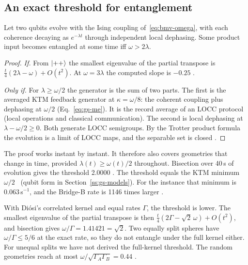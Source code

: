 \subsection{An exact threshold for entanglement}\label{ss:bmv-threshold}

\begin{proposition}[threshold]\label{pr:bmv-threshold}
Let two qubits evolve with the Ising coupling of~\eqref{eq:bmv-omega}, with each coherence decaying as $e^{-\lambda t}$ through independent
local dephasing. Some product input becomes entangled at some time iff $\omega>2\lambda$.
\end{proposition}

\begin{proof}
\emph{If.} From $\lvert ++\rangle$ the smallest eigenvalue of the partial transpose is $\tfrac t4(2\lambda-\omega)+O(t^2)$. At $\omega=3\lambda$ the
computed slope is $-0.25$ .

\emph{Only if.} For $\lambda\ge\omega/2$ the generator is the sum of two parts. The first is the averaged KTM feedback generator at
$\kappa=\omega/8$: the coherent coupling plus dephasing at $\omega/2$ (Eq.~\eqref{eq:gs-me}). It is the record average of an LOCC protocol
(local operations and classical communication). The second is local dephasing at $\lambda-\omega/2\ge0$. Both generate LOCC semigroups. By
the Trotter product formula the evolution is a limit of LOCC maps, and the separable set is closed \tagP.
\end{proof}

The proof works instant by instant. It therefore also covers geometries that change in time, provided $\lambda(t)\ge\omega(t)/2$ throughout.
Bisection over 40\,s of evolution gives the threshold 2.0000 . The threshold equals the KTM minimum $\omega/2$~\cite{ktm}
(qubit form in Section~\ref{ss:gs-models}). For the instance that minimum is $0.063$\,s$^{-1}$, and the Bridge-B rate is 1146 times larger
.

With Di\'osi's correlated kernel and equal rates $\Gamma$, the threshold is lower. The smallest eigenvalue of the partial transpose is then
$\tfrac t4(2\Gamma-\sqrt2\,\omega)+O(t^2)$, and bisection gives $\omega/\Gamma=1.41421=\sqrt2$. Two equally split spheres have
$\omega/\Gamma\le5/6$ at the exact rate, so they do not entangle under the full kernel either. For unequal splits we have not derived the
full-kernel threshold. The random geometries reach at most $\omega/\sqrt{\Gamma_A\Gamma_B}=0.44$ .

